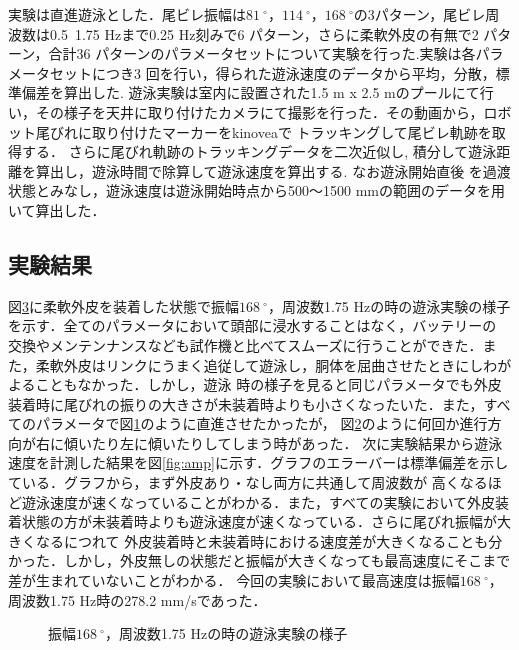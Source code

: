 実験は直進遊泳とした．尾ビレ振幅は$81\:^\circ$，$114\:^\circ$，$168\:^\circ$の3パターン，尾ビレ周波数は0.5~1.75 Hzまで0.25 Hz刻みで6 パターン，さらに柔軟外皮の有無で2 パターン，合計36 
パターンのパラメータセットについて実験を行った.実験は各パラメータセットにつき3 回を行い，得られた遊泳速度のデータから平均，分散，標準偏差を算出した.
遊泳実験は室内に設置された1.5 m x 2.5 mのプールにて行い，その様子を天井に取り付けたカメラにて撮影を行った．その動画から，ロボット尾びれに取り付けたマーカーをkinoveaで
トラッキングして尾ビレ軌跡を取得する．
さらに尾びれ軌跡のトラッキングデータを二次近似し, 積分して遊泳距離を算出し，遊泳時間で除算して遊泳速度を算出する. なお遊泳開始直後
を過渡状態とみなし，遊泳速度は遊泳開始時点から500～1500 mmの範囲のデータを用いて算出した．

\subsection{実験結果}
図\ref{fig:test_swim}に柔軟外皮を装着した状態で振幅$168\:^\circ$，周波数1.75 Hzの時の遊泳実験の様子を示す．全てのパラメータにおいて頭部に浸水することはなく，バッテリーの
交換やメンテンナンスなども試作機と比べてスムーズに行うことができた．また，柔軟外皮はリンクにうまく追従して遊泳し，胴体を屈曲させたときにしわがよることもなかった．しかし，遊泳
時の様子を見ると同じパラメータでも外皮装着時に尾びれの振りの大きさが未装着時よりも小さくなったいた．また，すべてのパラメータで図\ref{fig:str}のように直進させたかったが，
図\ref{fig:right}のように何回か進行方向が右に傾いたり左に傾いたりしてしまう時があった．
次に実験結果から遊泳速度を計測した結果を図\ref{fig:amp}に示す．グラフのエラーバーは標準偏差を示している．グラフから，まず外皮あり・なし両方に共通して周波数が
高くなるほど遊泳速度が速くなっていることがわかる．また，すべての実験において外皮装着状態の方が未装着時よりも遊泳速度が速くなっている．さらに尾びれ振幅が大きくなるにつれて
外皮装着時と未装着時における速度差が大きくなることも分かった．しかし，外皮無しの状態だと振幅が大きくなっても最高速度にそこまで差が生まれていないことがわかる．
今回の実験において最高速度は振幅$168\:^\circ$，周波数1.75 Hz時の278.2 mm/sであった．

\begin{figure}[htbp]
   \centering  
   \begin{subfigure}[b]{1\linewidth}
       \centering
       \label{fig:str}
   \end{subfigure}
   
   \begin{subfigure}[b]{1\linewidth}
       \centering
       \label{fig:right}
   \end{subfigure}
   \caption{振幅$168\:^\circ$，周波数1.75 Hzの時の遊泳実験の様子}
   \label{fig:test_swim}
\end{figure}

